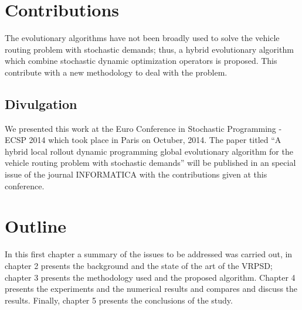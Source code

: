 \section{Contributions}

The evolutionary algorithms have not been broadly used to solve the vehicle routing problem with stochastic demands; thus, a hybrid evolutionary algorithm which combine stochastic dynamic optimization operators is proposed. This contribute with a new methodology to deal with the problem.

\subsection{Divulgation}


We presented this work at the Euro Conference in Stochastic Programming - ECSP 2014 which took place in Paris on Octuber, 2014. The  paper titled ``A hybrid local rollout dynamic programming global evolutionary algorithm for the vehicle routing problem with stochastic demands'' will be published in an special issue of the journal INFORMATICA with the contributions given at this conference.

\section{Outline}

In this first chapter a summary of the issues to be addressed was carried out, in chapter 2 presents the background and the state of the art of the VRPSD; chapter 3 presents the methodology used and the proposed algorithm. Chapter 4 presents the experiments and the numerical results and compares and discuss the results. Finally, chapter 5 presents the conclusions of the study.

